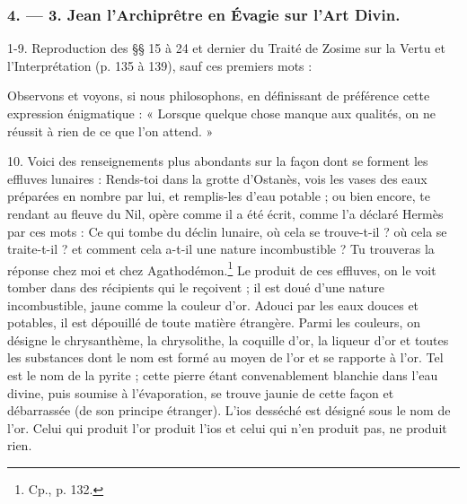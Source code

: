 \documentclass[a4paper, 11pt, oneside, polutonikogreek, french]{article}
\begin{document}
\bigskip
\centerline{\EightStarTaper}
\centerline{\EightStarTaper\EightStarTaper}
\bigskip

\subsubsection{4. --- 3. Jean l'Archiprêtre en Évagie sur l'Art Divin.}

1-9. Reproduction des §§ 15 à 24 et dernier du Traité de Zosime sur la Vertu et l'Interprétation (p. 135 à 139), sauf ces premiers mots :

Observons et voyons, si nous philosophons, en définissant de préférence cette expression énigmatique : « Lorsque quelque chose manque aux qualités, on ne réussit à rien de ce que l'on attend. »

10. Voici des renseignements plus abondants sur la façon dont se forment les effluves lunaires : Rends-toi dans la grotte d'Ostanès, vois les vases des eaux préparées en nombre par lui, et remplis-les d'eau potable ; ou bien encore, te rendant au fleuve du Nil, opère comme il a été écrit, comme l'a déclaré Hermès par ces mots : Ce qui tombe du déclin lunaire, où cela se trouve-t-il ? où cela se traite-t-il ? et comment cela a-t-il une nature incombustible ? Tu trouveras la réponse chez moi et chez Agathodémon.\footnote{Cp., p. 132.} Le produit de ces effluves, on le voit tomber dans des récipients qui le reçoivent ; il est doué d'une nature incombustible, jaune comme la couleur d'or. Adouci par les eaux douces et potables, il est dépouillé de toute matière étrangère. Parmi les couleurs, on désigne le chrysanthème, la chrysolithe, la coquille d'or, la liqueur d'or et toutes les substances dont le nom est formé au moyen de l'or et se rapporte à l'or. Tel est le nom de la pyrite ; cette pierre étant convenablement blanchie dans l'eau divine, puis soumise à l'évaporation, se trouve jaunie de cette façon et débarrassée (de son principe étranger). L'ios desséché est désigné sous le nom de l'or. Celui qui produit l'or produit l'ios et celui qui n'en produit pas, ne produit rien.
\end{document}
